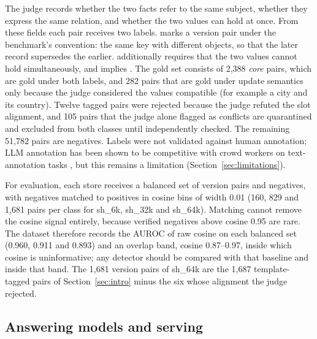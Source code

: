 \documentclass[journal=jcisd8,manuscript=article]{achemso}
\newcommand{\code}[1]{\texttt{\detokenize{#1}}}          %
\newcommand{\sub}[1]{\textsf{sh\_#1}}                    %
\begin{document}
The judge records whether the two facts refer to the same subject, whether they express the same relation, and whether the two values can hold at once. From these fields each pair receives two labels. \code{gold_update} marks a version pair under the benchmark's convention: the same key with different objects, so that the later record supersedes the earlier. \code{gold_strict} additionally requires that the two values cannot hold simultaneously, and implies \code{gold_update}. The gold set consists of 2,388 \emph{core} pairs, which are gold under both labels, and 282 pairs that are gold under update semantics only because the judge considered the values compatible (for example a city and its country). Twelve tagged pairs were rejected because the judge refuted the slot alignment, and 105 pairs that the judge alone flagged as conflicts are quarantined and excluded from both classes until independently checked. The remaining 51,782 pairs are negatives. Labels were not validated against human annotation; LLM annotation has been shown to be competitive with crowd workers on text-annotation tasks \cite{gilardi2023chatgpt}, but this remains a limitation (Section~\ref{sec:limitations}).

For evaluation, each store receives a balanced set of version pairs and negatives, with negatives matched to positives in cosine bins of width 0.01 (160, 829 and 1,681 pairs per class for \sub{6k}, \sub{32k} and \sub{64k}). Matching cannot remove the cosine signal entirely, because verified negatives above cosine 0.95 are rare. The dataset therefore records the AUROC of raw cosine on each balanced set (0.960, 0.911 and 0.893) and an overlap band, cosine 0.87--0.97, inside which cosine is uninformative; any detector should be compared with that baseline and inside that band. The 1,681 version pairs of \sub{64k} are the 1,687 template-tagged pairs of Section~\ref{sec:intro} minus the six whose alignment the judge rejected.

\subsection{Answering models and serving}
\label{sec:models}
\end{document}
